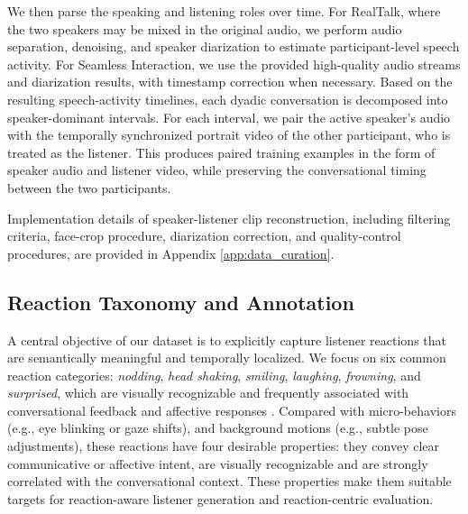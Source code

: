 We then parse the speaking and listening roles over time. For RealTalk, where the two speakers may be mixed in the original audio, we perform audio separation, denoising, and speaker diarization to estimate participant-level speech activity. For Seamless Interaction, we use the provided high-quality audio streams and diarization results, with timestamp correction when necessary. Based on the resulting speech-activity timelines, each dyadic conversation is decomposed into speaker-dominant intervals. For each interval, we pair the active speaker's audio with the temporally synchronized portrait video of the other participant, who is treated as the listener. This produces paired training examples in the form of speaker audio and listener video, while preserving the conversational timing between the two participants.

Implementation details of speaker-listener clip reconstruction, including filtering criteria, face-crop procedure, diarization correction, and quality-control procedures, are provided in Appendix \ref{app:data_curation}.








\subsection{Reaction Taxonomy and Annotation}  \label{sec:reaction_taxonomy}

A central objective of our dataset is to explicitly capture listener reactions that are semantically meaningful and temporally localized. We focus on six common reaction categories: \textit{nodding}, \textit{head shaking}, \textit{smiling}, \textit{laughing}, \textit{frowning}, and \textit{surprised}, which are visually recognizable and frequently associated with conversational feedback and affective responses \cite{ng2022learning,zhou2022vico,geng2023realtalk}. Compared with micro-behaviors (e.g., eye blinking or gaze shifts), and background motions (e.g., subtle pose adjustments), these reactions have four desirable properties: they convey clear communicative or affective intent, are visually recognizable and are strongly correlated with the conversational context. These properties make them suitable targets for reaction-aware listener generation and reaction-centric evaluation.

